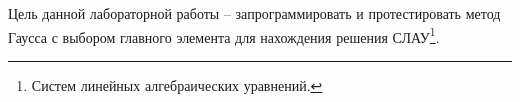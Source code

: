 
	Цель данной лабораторной работы -- запрограммировать и протестировать метод Гаусса с выбором главного элемента для нахождения решения СЛАУ\footnote{ Систем линейных алгебраических уравнений. }.
